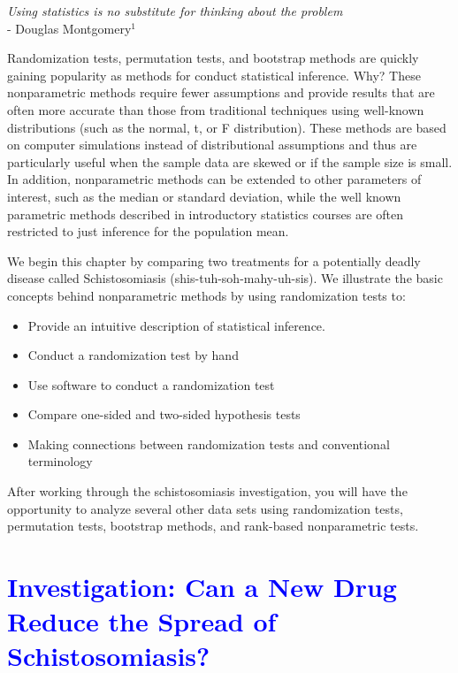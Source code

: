 \documentclass[
]{report}
\providecommand{\tightlist}{%
  \setlength{\itemsep}{0pt}\setlength{\parskip}{0pt}}
\begin{document}
\begin{flushright}
\emph{Using statistics is no substitute for thinking about the problem} \\
- Douglas Montgomery$^1$
\end{flushright}

Randomization tests, permutation tests, and bootstrap methods are quickly gaining popularity as methods for conduct statistical inference. Why? These nonparametric methods require fewer assumptions and provide results that are often more accurate than those from traditional techniques using well-known distributions (such as the normal, t, or F distribution). These methods are based on computer simulations instead of distributional assumptions and thus are particularly useful when the sample data are skewed or if the sample size is small. In addition, nonparametric methods can be extended to other parameters of interest, such as the median or standard deviation, while the well known parametric methods described in introductory statistics courses are often restricted to just inference for the population mean.

We begin this chapter by comparing two treatments for a potentially deadly disease called Schistosomiasis (shis-tuh-soh-mahy-uh-sis). We illustrate the basic concepts behind nonparametric methods by using randomization tests to:

\begin{itemize}
\tightlist
\item
  Provide an intuitive description of statistical inference.
\item
  Conduct a randomization test by hand
\item
  Use software to conduct a randomization test
\item
  Compare one-sided and two-sided hypothesis tests
\item
  Making connections between randomization tests and conventional terminology
\end{itemize}

After working through the schistosomiasis investigation, you will have the opportunity to analyze several other data sets using randomization tests, permutation tests, bootstrap methods, and rank-based nonparametric tests.

\newpage

\hypertarget{section}{%
\section{\texorpdfstring{\textcolor{blue}{Investigation: Can a New Drug Reduce the Spread of Schistosomiasis?}}{}}\label{section}}
\end{document}
